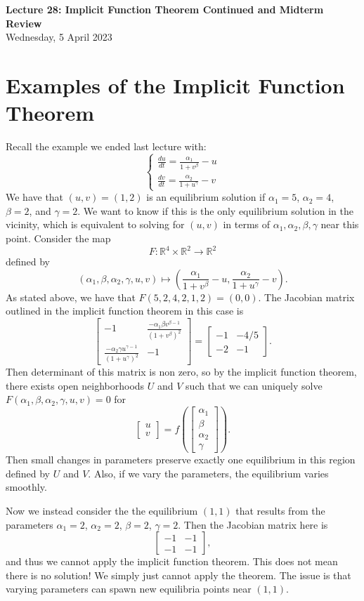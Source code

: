 \documentclass[11pt]{article}
\theoremstyle{definition}
\newcommand{\R}{\mathbb{R}}                      %
\newcommand{\mat}{\begin{bmatrix}}
\newcommand{\trix}{\end{bmatrix}}
\begin{document}
\thispagestyle{empty}

\begin{center}
{\LARGE \bf Lecture 28: Implicit Function Theorem Continued and Midterm Review}\\
{\large Wednesday, 5 April 2023}\\
\end{center}

\section{Examples of the Implicit Function Theorem}

Recall the example we ended last lecture with:
$$
\begin{cases}
    \frac{du}{dt}=\frac{\alpha_1}{1+v^\beta}-u\\
    \frac{dv}{dt}=\frac{\alpha_2}{1+u^\gamma}-v
\end{cases}
$$
We have that $(u,v)=(1,2)$ is an equilibrium solution if $\alpha_1=5$, $\alpha_2=4$, $\beta = 2$, and $\gamma=2$. We want to know if this is the only equilibrium solution in the vicinity, which is equivalent to solving for $(u,v)$ in terms of $\alpha_1,\alpha_2,\beta,\gamma$ near this point. Consider the map
$$
F:\R^4\times \R^2\to \R^2
$$
defined by
$$
(\alpha_1,\beta,\alpha_2,\gamma,u,v)\mapsto \left(\frac{\alpha_1}{1+v^\beta}-u, \frac{\alpha_2}{1+u^\gamma}-v\right).
$$
As stated above, we have that $F(5,2,4,2,1,2)=(0,0)$. The Jacobian matrix outlined in the implicit function theorem in this case is
$$
\mat -1 & \frac{-\alpha_1\beta v^{\beta-1}}{(1+v^\beta)^2} \\
\frac{-\alpha_2 \gamma u^{\gamma-1}}{(1+u^\gamma)^2} & -1\trix=\mat -1 & -4/5 \\ -2 & -1 \trix.
$$
Then determinant of this matrix is non zero, so by the implicit function theorem, there exists open neighborhoods $U$ and $V$ such that we can uniquely solve $F(\alpha_1,\beta,\alpha_2,\gamma,u,v)=0$ for
$$
\mat u\\ v \trix = f\left(\mat \alpha_1 \\ \beta \\ \alpha_2 \\ \gamma \trix \right).
$$
Then small changes in parameters preserve exactly one equilibrium in this region defined by $U$ and $V$. Also, if we vary the parameters, the equilibrium varies smoothly.

Now we instead consider the the equilibrium $(1,1)$ that results from the parameters $\alpha_1=2$, $\alpha_2=2$, $\beta = 2$, $\gamma =2$. Then the  Jacobian matrix here is 
$$
\mat -1 & -1 \\ -1 & -1\trix,
$$
and thus we cannot apply the implicit function theorem. This does not mean there is no solution! We simply just cannot apply the theorem. The issue is that varying parameters can spawn new equilibria points near $(1,1)$.
\end{document}
